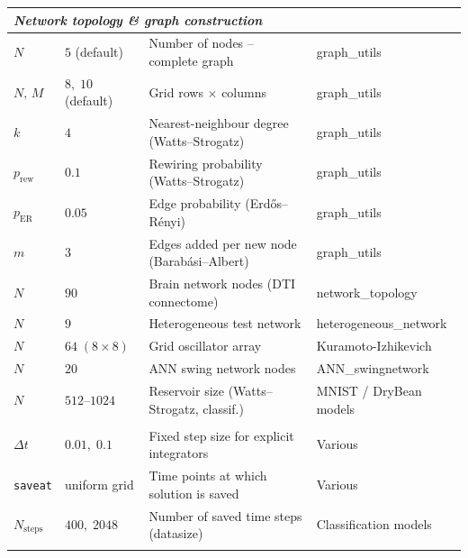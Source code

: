 \documentclass{article}
\begin{document}
\begin{longtable}{@{}llll@{}}
\multicolumn{4}{l}{\textit{Network topology \& graph construction}} \\
\midrule
$N$               & $5$ (default)             & Number of nodes -- complete graph           & graph\_utils \\
$N,\,M$           & $8,\;10$ (default)        & Grid rows $\times$ columns                  & graph\_utils \\
$k$               & $4$                       & Nearest-neighbour degree (Watts--Strogatz)  & graph\_utils \\
$p_{\text{rew}}$  & $0.1$                     & Rewiring probability (Watts--Strogatz)      & graph\_utils \\
$p_{\text{ER}}$   & $0.05$                    & Edge probability (Erd\H{o}s--R\'{e}nyi)     & graph\_utils \\
$m$               & $3$                       & Edges added per new node (Barab\'{a}si--Albert) & graph\_utils \\
$N$               & $90$                      & Brain network nodes (DTI connectome)        & network\_topology \\
$N$               & $9$                       & Heterogeneous test network                  & heterogeneous\_network \\
$N$               & $64\;(8{\times}8)$        & Grid oscillator array                       & Kuramoto-Izhikevich \\
$N$               & $20$                      & ANN swing network nodes                     & ANN\_swingnetwork \\
$N$               & $512$--$1024$             & Reservoir size (Watts--Strogatz, classif.)  & MNIST / DryBean models \\
\addlinespace

\multicolumn{4}{l}{\textit{ODE solver settings}} \\
\midrule
$\Delta t$        & $0.01,\;0.1$              & Fixed step size for explicit integrators    & Various \\
\texttt{saveat}   & uniform grid              & Time points at which solution is saved      & Various \\
$N_{\text{steps}}$& $400,\;2048$              & Number of saved time steps (datasize)       & Classification models \\
\addlinespace


\end{longtable}
\end{document}

